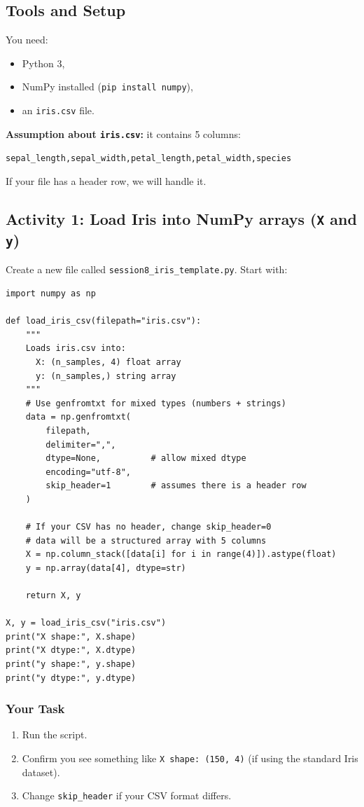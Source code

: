\subsection{Tools and Setup}
\noindent
You need:
\begin{itemize}\setlength{\itemsep}{0pt}
\item Python 3,
\item NumPy installed (\texttt{pip install numpy}),
\item an \texttt{iris.csv} file.
\end{itemize}

\noindent
\textbf{Assumption about \texttt{iris.csv}:} it contains 5 columns:
\begin{center}
    \texttt{sepal\_length,sepal\_width,petal\_length,petal\_width,species}
\end{center}

\noindent
If your file has a header row, we will handle it.

\newpage
\subsection{Activity 1: Load Iris into NumPy arrays (\texttt{X} and \texttt{y})}

\noindent
Create a new file called \texttt{session8\_iris\_template.py}. Start with:

\begin{verbatim}
import numpy as np

def load_iris_csv(filepath="iris.csv"):
    """
    Loads iris.csv into:
      X: (n_samples, 4) float array
      y: (n_samples,) string array
    """
    # Use genfromtxt for mixed types (numbers + strings)
    data = np.genfromtxt(
        filepath,
        delimiter=",",
        dtype=None,          # allow mixed dtype
        encoding="utf-8",
        skip_header=1        # assumes there is a header row
    )

    # If your CSV has no header, change skip_header=0
    # data will be a structured array with 5 columns
    X = np.column_stack([data[i] for i in range(4)]).astype(float)
    y = np.array(data[4], dtype=str)

    return X, y

X, y = load_iris_csv("iris.csv")
print("X shape:", X.shape)
print("X dtype:", X.dtype)
print("y shape:", y.shape)
print("y dtype:", y.dtype)
\end{verbatim}

\subsubsection{Your Task}
\begin{enumerate}
    \item Run the script.
    \item Confirm you see something like \texttt{X shape: (150, 4)} (if using the standard Iris dataset).
    \item Change \texttt{skip\_header} if your CSV format differs.
\end{enumerate}

